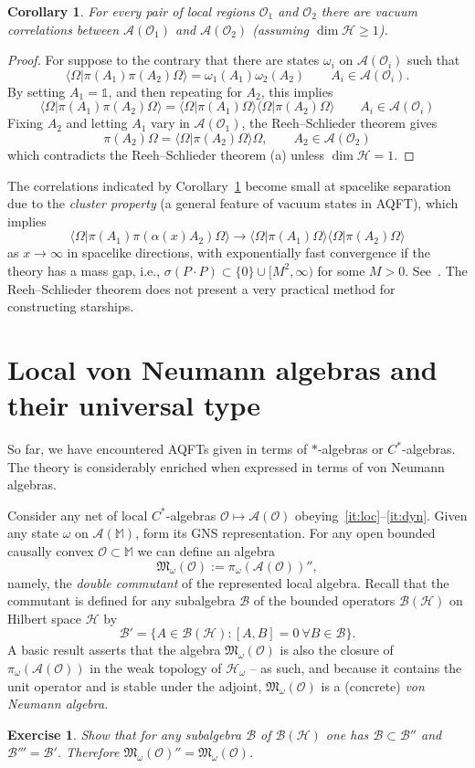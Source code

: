 \documentclass[12pt,a4paper]{article}
\newcommand{\1}{\mathds{1}}                         %
\newcommand{\Ocal}{\mathcal{O}}
\newcommand{\MM}{\mathbb{M}}
\newcommand{\BB}{{\mathcal{B}}}
\newcommand{\HH}{{\mathcal{H}}}
\newcommand{\Mf}{{\mathfrak{M}}}
\newcommand{\II}{{\mathbb{1}}}
\newcommand{\Ac}{{\mathcal{A}}}
\newcommand{\Bc}{{\mathcal{B}}}
\newcommand{\ip}[2]{\langle #1|#2\rangle}
\newtheorem{corollary}[theorem]{Corollary}
\newtheorem{exercise}[theorem]{Exercise}
\begin{document}
\begin{corollary}\label{cor:vaccor}
For every pair of local regions $\Ocal_1$ and $\Ocal_2$ there are vacuum correlations between $\Ac(\Ocal_1)$ and $\Ac(\Ocal_2)$ (assuming $\dim \HH\ge 1$).
\end{corollary}
\begin{proof}
	For suppose to the contrary that there are states $\omega_i$ on $\Ac(\Ocal_i)$ such that 
	\[
	\ip{\Omega}{\pi(A_1)\pi(A_2)\Omega} = \omega_1(A_1)\omega_2(A_2)\qquad A_i\in\Ac(\Ocal_i).
	\]
	By setting $A_1=\II$, and then repeating for $A_2$, this implies 
	\[
	\ip{\Omega}{\pi(A_1)\pi(A_2)\Omega} = 	\ip{\Omega}{\pi(A_1) \Omega}	\ip{\Omega}{ \pi(A_2)\Omega}\qquad A_i\in\Ac(\Ocal_i)
	\] 
	Fixing $A_2$ and letting $A_1$ vary in $\Ac(\Ocal_1)$, the Reeh--Schlieder theorem gives
	\[
	\pi(A_2)\Omega = \ip{\Omega}{ \pi(A_2)\Omega}\Omega,\qquad A_2\in\Ac(\Ocal_2)
	\]
	which contradicts the Reeh--Schlieder theorem (a) unless $\dim\HH=1$. 
\end{proof}
The correlations indicated by Corollary~\ref{cor:vaccor} become small at spacelike separation due to the
\emph{cluster property} (a general feature of vacuum states in AQFT), which implies 
\[
\ip{\Omega}{\pi(A_1)\pi(\alpha(x)A_2)\Omega} \to	\ip{\Omega}{\pi(A_1) \Omega}	\ip{\Omega}{ \pi(A_2)\Omega}
\]
as $x\to\infty$ in spacelike directions, with exponentially fast convergence if the theory has a mass gap, i.e., $\sigma(P\cdot P)\subset\{0\}\cup[M^2,\infty)$ for some $M>0$. See~\cite[\S 4.3-4.4]{Araki}. The Reeh--Schlieder theorem does not present a very practical method for constructing starships.

\section{Local von Neumann algebras and their universal type} \label{sec:universaltype}

So far, we have encountered AQFTs given in terms of $*$-algebras or $C^*$-algebras. The theory is considerably enriched when expressed in terms of
von Neumann algebras. 

Consider any net of local $C^*$-algebras $\Ocal\mapsto\Ac(\Ocal)$ obeying~\ref{it:loc}--\ref{it:dyn}.
Given any state $\omega$ on $\Ac(\MM)$, form its GNS representation. For any open bounded causally convex $\Ocal\subset\MM$ we can define an algebra
\[
\Mf_\omega(\Ocal) := \pi_\omega(\Ac(\Ocal))'',
\]
namely, the \emph{double commutant} of the represented local algebra. Recall that
the commutant is defined for any subalgebra $\Bc$ of the bounded operators $\BB(\HH)$ on Hilbert space $\HH$ by 
\[
\Bc' = \{A\in\BB(\HH): [A,B]=0~\forall B\in\Bc\}.
\]
A basic result asserts that the algebra $\Mf_\omega(\Ocal)$ is also the closure of $\pi_\omega(\Ac(\Ocal))$ in the weak topology of $\HH_\omega$ -- as such, and because it contains the unit operator and is stable under the adjoint, $\Mf_\omega(\Ocal)$ is a (concrete) \emph{von Neumann algebra}. 
\begin{exercise}
	Show that for any subalgebra $\Bc$ of $\Bc(\HH)$ one has $\Bc\subset \Bc''$ and $\Bc'''=\Bc'$.
	Therefore $\Mf_\omega(\Ocal)''=\Mf_\omega(\Ocal)$. 
\end{exercise}
\end{document}
